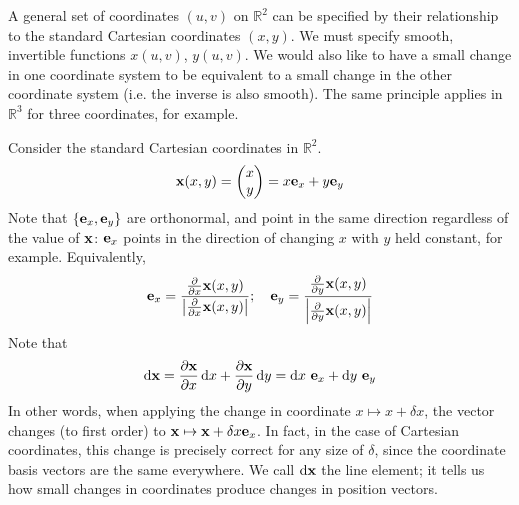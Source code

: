 A general set of coordinates \((u, v)\) on \(\mathbb R^2\) can be specified by their relationship to the standard Cartesian coordinates \((x, y)\). We must specify smooth, invertible functions \(x(u, v)\), \(y(u, v)\). We would also like to have a small change in one coordinate system to be equivalent to a small change in the other coordinate system (i.e. the inverse is also smooth). The same principle applies in \(\mathbb R^3\) for three coordinates, for example.

Consider the standard Cartesian coordinates in \(\mathbb R^2\).
\[ \vb x(x, y) = \begin{pmatrix}
		x \\ y
	\end{pmatrix} = x \vb e_x + y \vb e_y \]
Note that \(\{\vb e_x, \vb e_y\}\) are orthonormal, and point in the same direction regardless of the value of \(\vb x\): \(\vb e_x\) points in the direction of changing \(x\) with \(y\) held constant, for example. Equivalently,
\[ \vb e_x = \frac{\frac{\partial}{\partial x} \vb x(x, y)}{\abs{\frac{\partial}{\partial x} \vb x(x, y)}};\quad \vb e_y = \frac{\frac{\partial}{\partial y} \vb x(x, y)}{\abs{\frac{\partial}{\partial y} \vb x(x, y)}} \]
Note that
\[ \dd \vb x = \frac{\partial \vb x}{\partial x}\dd{x} + \frac{\partial \vb x}{\partial y} \dd{y} = \dd{x} \,\vb e_x + \dd{y} \,\vb e_y \]
In other words, when applying the change in coordinate \(x \mapsto x + \delta x\), the vector changes (to first order) to \(\vb x \mapsto \vb x + \delta x \vb e_x\). In fact, in the case of Cartesian coordinates, this change is precisely correct for any size of \(\delta\), since the coordinate basis vectors are the same everywhere. We call \(\dd \vb x\) the line element; it tells us how small changes in coordinates produce changes in position vectors.

